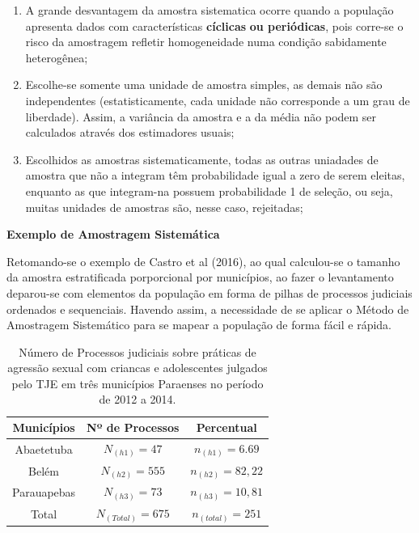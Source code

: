 \begin{enumerate}
  \item[{a)}] A grande desvantagem da amostra sistematica ocorre
  quando a população apresenta dados com características \textbf{cíclicas}
  \textbf{ou periódicas}, pois corre-se o risco da amostragem refletir
  homogeneidade numa condição sabidamente heterogênea;
  \item[{b)}] Escolhe-se somente uma unidade de amostra simples, as demais não são independentes (estatisticamente, cada unidade não corresponde a um grau de liberdade). Assim, a variância da amostra e a da média não podem ser calculados através dos estimadores usuais;
  \item[{c)}] Escolhidos as amostras sistematicamente, todas as outras uniadades de amostra que não a integram têm probabilidade igual a zero de serem eleitas, enquanto as que integram-na possuem probabilidade 1 de seleção, ou seja, muitas unidades de amostras são, nesse caso, rejeitadas;
\end{enumerate}

\textbf{Exemplo de Amostragem Sistemática}
\vskip0.3cm

Retomando-se o exemplo de Castro et al (2016), ao qual calculou-se o tamanho da amostra estratificada porporcional por municípios, ao fazer o levantamento deparou-se com elementos da população em forma de pilhas de processos judiciais ordenados e sequenciais. Havendo assim, a necessidade de se aplicar o Método de Amostragem Sistemático para se mapear a população de forma fácil e rápida.


\begin{table}[!htb]
    \centering
    {
    \caption{Número de Processos judiciais sobre práticas de agressão sexual com criancas e
adolescentes julgados pelo TJE em três municípios Paraenses no período de 2012 a 2014.}
    \label{amostras estratificada}
    \vspace{0.1cm}
\begin{tabular}{c|c|c}
  \hline\hline
  Municípios   & Nº de Processos &  Percentual \\
  \hline\hline
   Abaetetuba  & $N_{(h1)}=47$     & $n_{(h1)}= 6.69$        \\
   Belém       & $N_{(h2)}=555$    & $n_{(h2)}= 82,22$       \\
   Parauapebas & $N_{(h3)}=73$     & $n_{(h3)}= 10,81$       \\
   \hline\hline 
   Total       & $N_{(Total)}=675$ & $n_{(total)}=251$ \\ 
  \hline\hline
\end{tabular}}
\\
\hspace{-1.0cm}
\end{table}


